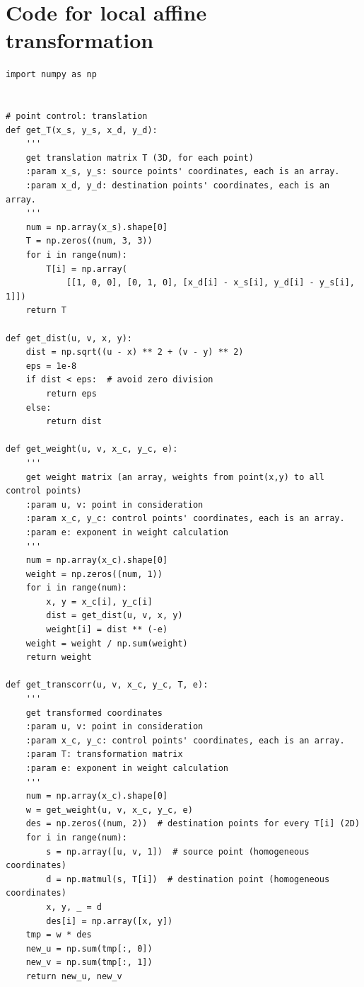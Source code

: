 \documentclass[UTF8]{ctexart}
\begin{document}
\newpage
\appendix
\hypertarget{code1}{\section{Code for local affine transformation}}
\begin{lstlisting}
import numpy as np


# point control: translation
def get_T(x_s, y_s, x_d, y_d):
    '''
    get translation matrix T (3D, for each point)
    :param x_s, y_s: source points' coordinates, each is an array.
    :param x_d, y_d: destination points' coordinates, each is an array.
    '''
    num = np.array(x_s).shape[0]
    T = np.zeros((num, 3, 3))
    for i in range(num):
        T[i] = np.array(
            [[1, 0, 0], [0, 1, 0], [x_d[i] - x_s[i], y_d[i] - y_s[i], 1]])
    return T

def get_dist(u, v, x, y):
    dist = np.sqrt((u - x) ** 2 + (v - y) ** 2)
    eps = 1e-8
    if dist < eps:  # avoid zero division
        return eps
    else:
        return dist

def get_weight(u, v, x_c, y_c, e):
    '''
    get weight matrix (an array, weights from point(x,y) to all control points)
    :param u, v: point in consideration
    :param x_c, y_c: control points' coordinates, each is an array.
    :param e: exponent in weight calculation
    '''
    num = np.array(x_c).shape[0]
    weight = np.zeros((num, 1))
    for i in range(num):
        x, y = x_c[i], y_c[i]
        dist = get_dist(u, v, x, y)
        weight[i] = dist ** (-e)
    weight = weight / np.sum(weight)
    return weight

def get_transcorr(u, v, x_c, y_c, T, e):
    '''
    get transformed coordinates
    :param u, v: point in consideration
    :param x_c, y_c: control points' coordinates, each is an array.
    :param T: transformation matrix
    :param e: exponent in weight calculation
    '''
    num = np.array(x_c).shape[0]
    w = get_weight(u, v, x_c, y_c, e)
    des = np.zeros((num, 2))  # destination points for every T[i] (2D)
    for i in range(num):
        s = np.array([u, v, 1])  # source point (homogeneous coordinates)
        d = np.matmul(s, T[i])  # destination point (homogeneous coordinates)
        x, y, _ = d
        des[i] = np.array([x, y])
    tmp = w * des
    new_u = np.sum(tmp[:, 0])
    new_v = np.sum(tmp[:, 1])
    return new_u, new_v
\end{lstlisting}
\end{document}

